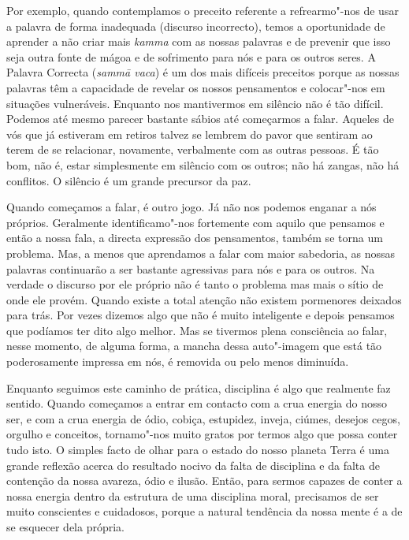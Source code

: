 Por exemplo, quando contemplamos o preceito referente a refrearmo"-nos de
usar a palavra de forma inadequada (discurso incorrecto), temos a
oportunidade de aprender a não criar mais \emph{kamma} com as nossas
palavras e de prevenir que isso seja outra fonte de mágoa e de
sofrimento para nós e para os outros seres. A Palavra Correcta
(\emph{sammā vaca}) é um dos mais difíceis preceitos porque as nossas
palavras têm a capacidade de revelar os nossos pensamentos e colocar"-nos
em situações vulneráveis. Enquanto nos mantivermos em silêncio não é tão
difícil. Podemos até mesmo parecer bastante sábios até começarmos a
falar. Aqueles de vós que já estiveram em retiros talvez se lembrem do
pavor que sentiram ao terem de se relacionar, novamente, verbalmente com
as outras pessoas. É tão bom, não é, estar simplesmente em silêncio com
os outros; não há zangas, não há conflitos. O silêncio é um grande
precursor da paz.

Quando começamos a falar, é outro jogo. Já não nos podemos enganar a nós
próprios. Geralmente identificamo"-nos fortemente com aquilo que pensamos
e então a nossa fala, a directa expressão dos pensamentos, também se
torna um problema. Mas, a menos que aprendamos a falar com maior
sabedoria, as nossas palavras continuarão a ser bastante agressivas para
nós e para os outros. Na verdade o discurso por ele próprio não é tanto
o problema mas mais o sítio de onde ele provém. Quando existe a total 
atenção não existem pormenores deixados para trás. Por vezes dizemos
algo que não é muito inteligente e depois pensamos que podíamos ter dito
algo melhor. Mas se tivermos plena consciência ao falar, nesse momento,
de alguma forma, a mancha dessa auto"-imagem que está tão poderosamente
impressa em nós, é removida ou pelo menos diminuída.

Enquanto seguimos este caminho de prática, disciplina é algo que
realmente faz sentido. Quando começamos a entrar em contacto com a crua
energia do nosso ser, e com a crua energia de ódio, cobiça, estupidez,
inveja, ciúmes, desejos cegos, orgulho e conceitos, tornamo"-nos muito
gratos por termos algo que possa conter tudo isto. O simples facto de
olhar para o estado do nosso planeta Terra é uma grande reflexão acerca
do resultado nocivo da falta de disciplina e da falta de contenção da
nossa avareza, ódio e ilusão. Então, para sermos capazes de conter a
nossa energia dentro da estrutura de uma disciplina moral, precisamos de
ser muito conscientes e cuidadosos, porque a natural tendência da nossa
mente é a de se esquecer dela própria.

